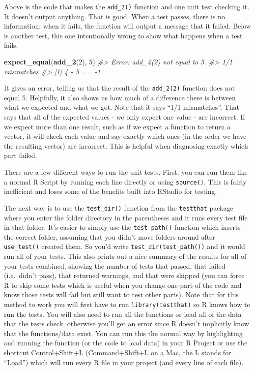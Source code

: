 \documentclass[
  12pt,
]{book}
\newenvironment{Shaded}{\begin{snugshade}}{\end{snugshade}}
\newcommand{\CommentTok}[1]{\textcolor[rgb]{0.37,0.37,0.37}{\textit{#1}}}
\newcommand{\DecValTok}[1]{\textcolor[rgb]{0.06,0.06,0.06}{#1}}
\newcommand{\KeywordTok}[1]{\textcolor[rgb]{0.27,0.27,0.27}{\textbf{#1}}}
\newcommand{\NormalTok}[1]{#1}
\begin{document}
Above is the code that makes the \texttt{add\_2()} function and one unit test checking it. It doesn't output anything. That is good. When a test passes, there is no information; when it fails, the function will output a message that it failed. Below is another test, this one intentionally wrong to show what happens when a test fails.

\begin{Shaded}
\begin{Highlighting}[]
\KeywordTok{expect\_equal}\NormalTok{(}\KeywordTok{add\_2}\NormalTok{(}\DecValTok{2}\NormalTok{), }\DecValTok{5}\NormalTok{)}
\CommentTok{\#> Error: add\_2(2) not equal to 5.}
\CommentTok{\#> 1/1 mismatches}
\CommentTok{\#> [1] 4 {-} 5 == {-}1}
\end{Highlighting}
\end{Shaded}

It gives an error, telling us that the result of the \texttt{add\_2(2)} function does not equal 5. Helpfully, it also shows us how much of a difference there is between what we expected and what we got. Note that it says ``1/1 mismatches''. That says that all of the expected values - we only expect one value - are incorrect. If we expect more than one result, such as if we expect a function to return a vector, it will check each value and say exactly which ones (in the order we have the resulting vector) are incorrect. This is helpful when diagnosing exactly which part failed.

There are a few different ways to run the unit tests. First, you can run them like a normal R Script by running each line directly or using \texttt{source()}. This is fairly inefficient and loses some of the benefits built into RStudio for testing.

The next way is to use the \texttt{test\_dir()} function from the \texttt{testthat} package where you enter the folder directory in the parentheses and it runs every test file in that folder. It's easier to simply use the \texttt{test\_path()} function which inserts the correct folder, assuming that you didn't move folders around after \texttt{use\_test()} created them. So you'd write \texttt{test\_dir(test\_path())} and it would run all of your tests. This also prints out a nice summary of the results for all of your tests combined, showing the number of tests that passed, that failed (i.e.~didn't pass), that returned warnings, and that were skipped (you can force R to skip some tests which is useful when you change one part of the code and know those tests will fail but still want to test other parts). Note that for this method to work you will first have to run \texttt{library(testthat)} so R knows how to run the tests. You will also need to run all the functions or load all of the data that the tests check, otherwise you'll get an error since R doesn't implicitly know that the functions/data exist. You can run this the normal way by highlighting and running the function (or the code to load data) in your R Project or use the shortcut Control+Shift+L (Command+Shift+L on a Mac, the L stands for ``Load'') which will run every R file in your project (and every line of each file).
\end{document}
